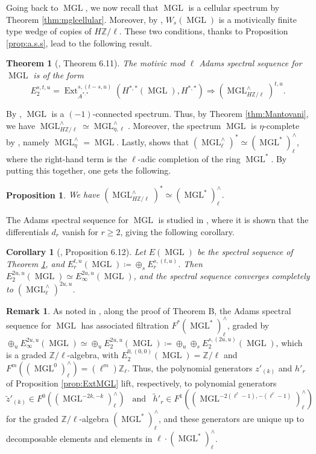\documentclass[10pt]{amsart}
\theoremstyle{definition}
\newtheorem{rmk}[defn]{Remark}
\theoremstyle{plain}
\newtheorem{thm}[defn]{Theorem}
\newtheorem{prop}[defn]{Proposition}
\newtheorem{corollary}[defn]{Corollary}
\numberwithin{equation}{section}
\newcommand{\0}{\emptyset}
\newcommand{\Z}{{\mathbb Z}}
\newcommand{\MGL}{{\operatorname{MGL}}}
\newcommand{\Ext}{{\operatorname{Ext}}}
\begin{document}
Going back to $\MGL$, we now recall that $\MGL$ is a cellular spectrum by Theorem \ref{thm:mglcellular}. Moreover, by \cite[Proposition 6.10]{lev:ellcoh}, $W_s(\MGL)$ is a motivically finite type wedge of copies of $H\Z/\ell$. These two conditions, thanks to Proposition \ref{prop:a.s.s}, lead to the following result.

\begin{thm}[\cite{lev:ellcoh}, Theorem 6.11]
\label{thm:a.s.sMGL}
The motivic mod $\ell$ Adams spectral sequence for $\MGL$ is of the form
$$E_2^{s,t,u}=\Ext_{A^{*,*}}^{s,(t-s,u)}(H^{*,*}(\MGL),H^{*,*}) \Rightarrow (\MGL_{H\Z/\ell}^\wedge)^{t,u}.$$
\end{thm}

By \cite[Corollary 2.3]{lev:ellcoh}, $\MGL$ is a $(-1)$-connected spectrum. Thus, by Theorem \ref{thm:Mantovani}, we have $\MGL_{H\Z/\ell}^\wedge \simeq \MGL_{\eta,\ell}^\wedge$. Moreover, the spectrum $\MGL$ is $\eta$-complete by \cite[Lemma 2.1]{Rondigs:Hopf}, namely $\MGL^\wedge_\eta = \MGL$. Lastly, \cite[Lemma 6.3]{lev:ellcoh} shows that $(\MGL^\wedge_\ell)^* \simeq (\MGL^*)^\wedge_\ell$, where the right-hand term is the $\ell$-adic completion of the ring $\MGL^*$. By putting this together, one gets the following.

\begin{prop}
    We have $(\MGL_{H\Z/ \ell}^\wedge)^* \simeq (\MGL^*)^\wedge _\ell$.
\end{prop}

The Adams spectral sequence for $\MGL$ is studied in \cite[Section 6.5]{lev:ellcoh}, where it is shown that the differentials $d_r$ vanish for $r\ge2$, giving the following corollary.

\begin{corollary}[\cite{lev:ellcoh}, Proposition 6.12]
    Let $E(\MGL)$ be the spectral sequence of Theorem \ref{thm:a.s.sMGL}, and $E_r^{t,u}(\MGL)\coloneqq \oplus_sE_r^{s,(t,u)}$. Then $E_2^{2u,u}(\MGL)\simeq E_\infty^{2u,u}(\MGL)$, and the spectral sequence converges completely to $(\MGL_\ell^\wedge)^{2u,u}$.
\end{corollary}

\begin{rmk}
\label{rmk:liftingGenerators}
    As noted in \cite[Section 6.6]{lev:ellcoh}, along the proof of Theorem B, the Adams spectral sequence for $\MGL$ has associated filtration $F^*(\MGL^*)^\wedge_\ell$, graded by $\oplus_u E_\infty^{2u,u}(\MGL)\simeq \oplus_u E_2^{2u,u}(\MGL) \coloneqq \oplus_u \oplus_s E_2^{s,(2u,u)}(\MGL)$, which is a graded $\Z/\ell$-algebra, with $E_2^{0,(0,0)}(\MGL)=\Z/\ell$ and $F^m((\MGL^0)_\ell^\wedge)=(\ell^m)\Z_\ell$. Thus, the polynomial generators $z'_{(k)}$ and $h'_r$ of Proposition \ref{prop:ExtMGL} lift, respectively, to polynomial generators
    $$\tilde{z}'_{(k)} \in F^0((\MGL^{-2k,-k})^\wedge_\ell) \; \; \; \text{and} \; \; \; \tilde{h}'_r \in F^1((\MGL^{-2(\ell^r-1),-(\ell^r-1)})_\ell^\wedge)$$
    for the graded $\Z/\ell$-algebra $(\MGL^*)^\wedge_\ell$, and these generators are unique up to decomposable elements and elements in $\ell \cdot (\MGL^*)^\wedge_\ell$.
\end{rmk}
\end{document}
